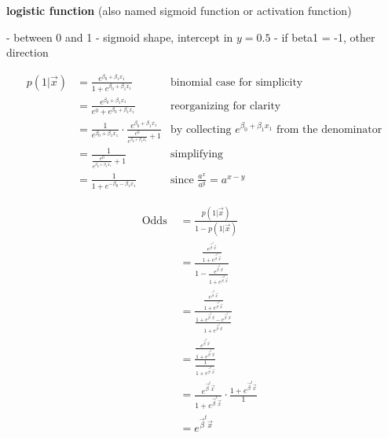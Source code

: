 \textbf{logistic function} (also named sigmoid function or activation function)

- between 0 and 1
- sigmoid shape, intercept in $y=0.5$
- if beta1 = -1, other direction

\begin{align*}
  p(1|\vec{x}) & = \frac{e^{\beta_0 + \beta_1 x_1}} {1+e^{\beta_0 + \beta_1 x_1}}
               & \text{binomial case for simplicity} \\
               & = \frac{e^{\beta_0 + \beta_1 x_1}} {e^0+e^{\beta_0 + \beta_1 x_1}}
               & \text{reorganizing for clarity} \\
               & = \frac{1}{e^{\beta_0 + \beta_1 x_1}} \cdot \frac{e^{\beta_0 + \beta_1 x_1}}{\frac{e^0}{e^{\beta_0 + \beta_1 x_1}} + 1}
               & \text{by collecting } e^{\beta_0 + \beta_1 x_1} \text{ from the denominator}\\
               & = \frac{1}{\frac{e^0}{e^{\beta_0 + \beta_1 x_1}} + 1} 
               & \text{simplifying}\\ 
               & = \frac{1}{1 + e^{-\beta_0 - \beta_1 x_1}}
               & \text{since } \frac{a^x}{a^y} = a^{x-y}
\end{align*}

\begin{align*}
  \text{Odds } &= \frac{p(1|\vec{x})}{1 - p(1|\vec{x})}
               & \text{}\\
               &= \frac{\frac{e^{\vec{\beta}^t\vec{x}}}{1 + e^{\vec{\beta}^t\vec{x}}}}
                       {1 - \frac{e^{\vec{\beta}^t\vec{x}}}{1 + e^{\vec{\beta}^t\vec{x}}}}
               & \text{}\\
               &= \frac{\frac{e^{\vec{\beta}^t\vec{x}}}{1 + e^{\vec{\beta}^t\vec{x}}}}
                       {\frac{1 + e^{\vec{\beta}^t\vec{x}} - e^{\vec{\beta}^t\vec{x}}}{1 + e^{\vec{\beta}^t\vec{x}}}}
               & \text{}\\
               &= \frac{\frac{e^{\vec{\beta}^t\vec{x}}}{1 + e^{\vec{\beta}^t\vec{x}}}}
                       {\frac{1}{1 + e^{\vec{\beta}^t\vec{x}}}}
               & \text{}\\
               &= \frac{e^{\vec{\beta}^t\vec{x}}}{1 + e^{\vec{\beta}^t\vec{x}}} \cdot
                       \frac{1 + e^{\vec{\beta}^t\vec{x}}}{1}
               & \text{}\\
               &= e^{\vec{\beta}^t\vec{x}}
               & \text{}\\
\end{align*}

